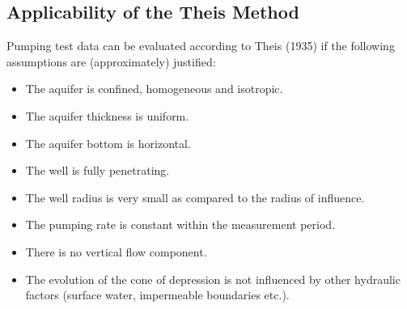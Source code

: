 \documentclass[letterpaper,10pt,english]{jupyterBook}
\begin{document}
\subsection{Applicability of the Theis Method}
\label{\detokenize{content/flow/L8/18_wells:applicability-of-the-theis-method}}
\sphinxAtStartPar
Pumping test data can be evaluated according to Theis (1935) if the following assumptions are (approximately) justified:
\begin{itemize}
\item {} 
\sphinxAtStartPar
The aquifer is confined, homogeneous and isotropic.

\end{itemize}
\begin{itemize}
\item {} 
\sphinxAtStartPar
The aquifer thickness is uniform.

\end{itemize}
\begin{itemize}
\item {} 
\sphinxAtStartPar
The aquifer bottom is horizontal.

\end{itemize}
\begin{itemize}
\item {} 
\sphinxAtStartPar
The well is fully penetrating.

\end{itemize}
\begin{itemize}
\item {} 
\sphinxAtStartPar
The well radius is very small as compared to the radius of influence.

\end{itemize}
\begin{itemize}
\item {} 
\sphinxAtStartPar
The pumping rate is constant within the measurement period.

\end{itemize}
\begin{itemize}
\item {} 
\sphinxAtStartPar
There is no vertical flow component.

\end{itemize}
\begin{itemize}
\item {} 
\sphinxAtStartPar
The evolution of the cone of depression is not influenced by other hydraulic factors (surface water, impermeable boundaries etc.).

\end{itemize}
\end{document}
